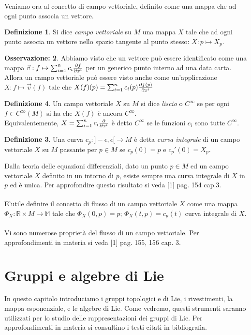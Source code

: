 \documentclass[12pt,a4paper]{report}
\theoremstyle{definition}
\newtheorem{Def}{Definizione}[chapter]
\theoremstyle{definition}
\theoremstyle{definition}
\theoremstyle{definition}
\newtheorem{Obs}[Def]{Osservazione:}
\begin{document}
Veniamo ora al concetto di campo vettoriale, definito come una mappa che ad ogni punto associa un vettore.
\begin{Def}
	Si dice \textit{campo vettoriale} su $M$ una mappa $X$ tale che ad ogni punto associa un vettore nello spazio tangente al punto stesso: $X:p\mapsto X_p$. 
\end{Def}
\begin{Obs}
	Abbiamo visto che un vettore può essere identificato come una mappa $\vec{v}:f\mapsto\sum_{i=1}^{n}c_i{\partial f\over \partial x^i}$ per un generico punto interno ad una data carta. Allora un campo vettoriale può essere visto anche come un'applicazione $X:f\mapsto\vec{v}(f)$ tale che $X(f)(p)=\sum_{i=1}^{n}c_i(p){\partial f(p)\over \partial x^i}$
\end{Obs}
\begin{Def}
	Un campo vettoriale $X$ su $M$ si dice \textit{liscio} o $C^\infty$ se per ogni $f\in C^\infty(M)$ si ha che $X(f)$ è ancora $C^\infty$.
\\
Equivalentemente, $X=\sum_{i=1}^{n}c_i{\partial\over \partial x^i}$ è detto $C^\infty$ se le funzioni $c_i$ sono tutte $C^\infty$.
\begin{Def}
	Una curva $c_p:]-\epsilon,\epsilon[\rightarrow M$ è detta \textit{curva integrale} di un campo vettoriale $X$ su $M$ passante per $p\in M$ se $c_p(0)=p$ e $c_p'(0)=X_p$.
\end{Def}
Dalla teoria delle equazioni differenziali, dato un punto $p\in M$ ed un campo vettoriale $X$ definito in un intorno di $p$, esiste sempre una curva integrale di $X$ in $p$ ed è unica. Per approfondire questo risultato si veda [1] pag. 154 cap.3.\\
\\
E'utile definire il concetto di flusso di un campo vettoriale $X$ come una mappa $\Phi_X:\mathbb{R}\times M\rightarrow\mathbb{M}$ tale che $\Phi_X(0,p)=p$; $\Phi_X(t,p)=c_p(t)$ curva integrale di $X$.\\
\\
Vi sono numerose proprietà del flusso di un campo vettoriale. Per approfondimenti in materia si veda [1] pag. 155, 156 cap. 3.
\end{Def}
\chapter{Gruppi e algebre di Lie}
In questo capitolo introduciamo i gruppi topologici e di Lie, i rivestimenti, la mappa esponenziale, e le algebre di Lie. Come vedremo, questi strumenti saranno utilizzati per lo studio delle rappresentazioni dei gruppi di Lie. Per approfondimenti in materia si consultino i testi citati in bibliografia.
\end{document}
